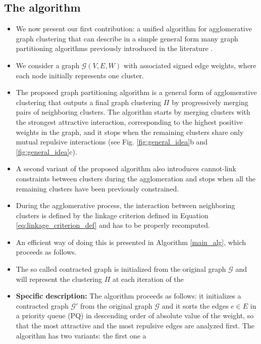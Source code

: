 \subsection{The algorithm}
\begin{itemize}
  \item We now present our first contribution: a unified algorithm for agglomerative graph clustering that can describe in a simple general form many graph partitioning algorithms previously introduced in the literature .
\item We consider a graph $\mathcal{G}(V,E,W)$ with associated signed edge weights, where each node initially represents one cluster.
\item The proposed graph partitioning algorithm is a general form of agglomerative clustering that outputs a final graph clustering $\Pi$ by progressively merging pairs of neighboring clusters. The algorithm starts by merging clusters with the strongest attractive interaction, corresponding to the highest positive weights in the graph, and it stops when the remaining clusters share only mutual repulsive interactions (see Fig. \ref{fig:general_idea}b and \ref{fig:general_idea}c). 

\item A second variant of the proposed algorithm also introduces cannot-link constraints between clusters during the agglomeration and stops when all the remaining clusters have been previously constrained.


\item During the agglomerative process, the interaction between neighboring clusters is defined by the linkage criterion defined in Equation \ref{eq:linkage_criterion_def} and has to be properly recomputed. 

 \item An efficient way of doing this is presented in Algorithm \ref{main_alg}, which proceeds as follows. 
\item The so called contracted graph is initialized from the original graph $\mathcal{G}$ and will represent the clustering $\Pi$ at each iteration of the 

\item \textbf{Specific description:}  The algorithm proceeds as follows: it initializes a contracted graph $\mathcal{G}'$ from the original graph $\mathcal{G}$ and it sorts the edges $e\in E$ in a priority queue (PQ) in descending order of absolute value  of the weight, so that the most attractive and the most repulsive edges are analyzed first. The algorithm has two variants: the first one a


\end{itemize}
